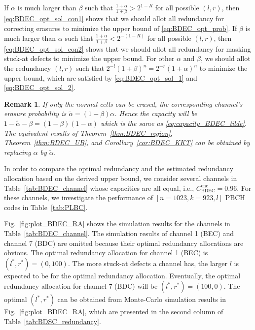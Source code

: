 \documentclass[10pt,twocolumn,twoside,submit]{JCNtran}
\newtheorem{remark}[theorem]{Remark}
\begin{document}
	If $\alpha$ is much larger than $\beta$ such that $\frac{1+\alpha}{1+\beta} > 2^{1 - R} $ for all possible $(l, r)$, then \eqref{eq:BDEC_opt_sol_con1} shows that we should allot all redundancy for correcting erasures to minimize the upper bound of \eqref{eq:BDEC_opt_prob}. If $\beta$ is much larger than $\alpha$ such that $\frac{1+\alpha}{1+\beta} < 2^{-(1 - R)}$ for all possible $(l, r)$, then \eqref{eq:BDEC_opt_sol_con2} shows that we should allot all redundancy for masking stuck-at defects to minimize the upper bound. For other $\alpha$ and $\beta$, we should allot the redundancy $(l, r)$ such that $2^{-l} \left(1 + \beta \right)^n = 2^{-r} \left( 1 + \alpha \right)^n$ to minimize the upper bound, which are satisfied by \eqref{eq:BDEC_opt_sol_1} and \eqref{eq:BDEC_opt_sol_2}.   
	
	\begin{remark}
		If only the normal cells can be erased, the corresponding channel's erasure probability is $\widetilde{\alpha} = (1-\beta)\alpha$. Hence the capacity will be $1 - \widetilde{\alpha} - \beta = (1 - \beta)(1-\alpha)$ which is the same as \eqref{eq:capacity_BDEC_tilde}. The equivalent results of Theorem~\ref{thm:BDEC_region}, Theorem~\ref{thm:BDEC_UB}, and Corollary~\ref{cor:BDEC_KKT} can be obtained by replacing $\alpha$ by $\widetilde{\alpha}$.
	\end{remark}
	

	
	In order to compare the optimal redundancy and the estimated redundancy allocation based on the derived upper bound, we consider several channels in Table~\ref{tab:BDEC_channel} whose capacities are all equal, i.e., $C_{\text{BDEC}}^{\text{enc}}=0.96$. For these channels, we investigate the performance of $\left[ n = 1023, k=923, l \right]$ PBCH codes in Table~\ref{tab:PLBC}.
	
	Fig.~\ref{fig:plot_BDEC_RA} shows the simulation results for the channels in Table~\ref{tab:BDEC_channel}. The simulation results of channel 1 (BEC) and channel 7 (BDC) are omitted because their optimal redundancy allocations are obvious. The optimal redundancy allocation for channel 1 (BEC) is $\left(l^*, r^* \right) = (0, 100)$. The more stuck-at defects a channel has, the larger $l$ is expected to be for the optimal redundancy allocation. Eventually, the optimal redundancy allocation for channel 7 (BDC) will be $\left(l^*, r^* \right) = (100, 0)$. The optimal $\left(l^*, r^*\right)$ can be obtained from Monte-Carlo simulation results in Fig.~\ref{fig:plot_BDEC_RA}, which are presented in the second column of Table~\ref{tab:BDSC_redundancy}.
	
\end{document}

